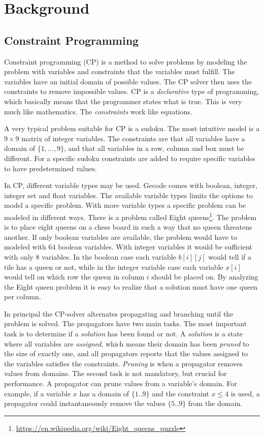 \documentclass[a4paper,11pt]{article}
\begin{document}
\section{Background}
\subsection{Constraint Programming}

Constraint programming (CP) is a method to solve problems by modeling the problem with variables and constraints that the variables must fulfill. The variables have an initial domain of possible values. The CP solver then uses the constraints to remove impossible values. CP is a \textit{declarative} type of programming, which basically means that the programmer states what is true. This is very much like mathematics. The \textit{constraints} work like equations.

A very typical problem suitable for CP is a sudoku. The most intuitive model is a $9\times9$ matrix of integer variables. The constraints are that all variables have a domain of $\{1,\ldots,9\}$, and that all variables in a row, column and box must be different. For a specific sudoku constraints are added to require specific variables to have predetermined values.

In CP, different variable types may be used. Gecode comes with boolean, integer, integer set and float variables. The available variable types limits the options to model a specific problem. With more variable types a specific problem can be modeled in different ways. There is a problem called Eight queens\footnote{\url{https://en.wikipedia.org/wiki/Eight_queens_puzzle}}. The problem is to place eight queens on a chess board in such a way that no queen threatens another. If only boolean variables are available, the problem would have to modeled with 64 boolean variables. With integer variables it would be sufficient with only 8 variables. In the boolean case each variable $b[i][j]$ would tell if a tile has a queen or not, while in the integer variable case each variable $x[i]$ would tell on which row the queen in column $i$ should be placed on. By analyzing the Eight queen problem it is easy to realize that a solution must have one queen per column.

In principal the CP-solver alternates propagating and branching until the problem is solved. The propagators have two main tasks. The most important task is to determine if a \textit{solution} has been found or not. A \textit{solution} is a state where all variables are \textit{assigned}, which means their domain has been \textit{pruned} to the size of exactly one, and all propagators reports that the values assigned to the variables satisfies the constraints. \textit{Pruning} is when a propagator removes values from domains. The second task is not mandatory, but crucial for performance. A propagator can prune values from a variable's domain. For example, if a variable $x$ has a domain of $\{1..9\}$ and the constraint $x\le 4$ is used, a propagator could instantaneously remove the values $\{5..9\}$ from the domain.
\end{document}
